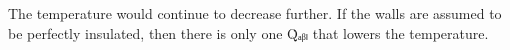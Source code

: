 The temperature would continue to decrease further. If the walls are assumed to be perfectly insulated, then there is only one Q̇ₐᵦₗ that lowers the temperature.